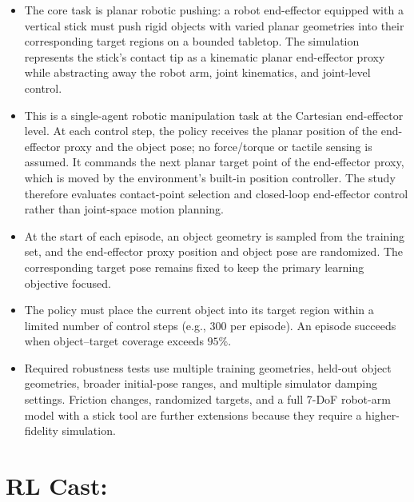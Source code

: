 \documentclass[11pt,onecolumn]{IEEEtran}
\begin{document}
\begin{itemize}

    \item
    The core task is planar robotic pushing: a robot end-effector equipped with
    a vertical stick must push rigid objects with varied planar geometries into
    their corresponding target regions on a bounded tabletop. The simulation
    represents the stick's contact tip as a kinematic planar end-effector proxy
    while abstracting away the robot arm, joint kinematics, and joint-level
    control.

    \item
    This is a single-agent robotic manipulation task at the Cartesian
    end-effector level. At each control step, the policy receives the planar
    position of the end-effector proxy and the object pose; no force/torque or
    tactile sensing is assumed. It commands the next planar target point of the
    end-effector proxy, which is moved by the environment's built-in position
    controller. The study therefore evaluates contact-point selection and
    closed-loop end-effector control rather than joint-space motion planning.

    \item
    At the start of each episode, an object geometry is sampled from the
    training set, and the end-effector proxy position and object pose are
    randomized. The corresponding target pose remains fixed to keep the primary
    learning objective focused.

    \item
    The policy must place the current object into its target region within a
    limited number of control steps (e.g., 300 per episode). An episode succeeds
    when object--target coverage exceeds $95\%$.

    \item
    Required robustness tests use multiple training geometries, held-out object
    geometries, broader initial-pose ranges, and multiple simulator damping
    settings. Friction changes, randomized targets, and a full 7-DoF robot-arm
    model with a stick tool are further extensions because they require a
    higher-fidelity simulation.

\end{itemize}



\section*{RL Cast:}
\end{document}
